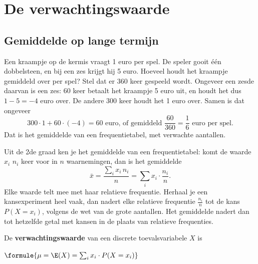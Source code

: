 \begin{oefeningen}

\end{oefeningen}

\section{De verwachtingswaarde}

\subsection{Gemiddelde op lange termijn}

Een kraampje op de kermis vraagt 1 euro per spel. De speler gooit één dobbelsteen, en bij een zes krijgt hij 5 euro. Hoeveel houdt het kraampje gemiddeld over per spel? Stel dat er 360 keer gespeeld wordt. Ongeveer een zesde daarvan is een zes: 60 keer betaalt het kraampje 5 euro uit, en houdt het dus $1 - 5 = -4$ euro over. De andere 300 keer houdt het 1 euro over. Samen is dat ongeveer
\[300 \cdot 1 + 60 \cdot (-4) = 60 \text{ euro, of gemiddeld } \frac{60}{360} = \frac16 \text{ euro per spel.}\]
Dat is het gemiddelde van een frequentietabel, met verwachte aantallen.

Uit de 2de graad ken je het gemiddelde van een frequentietabel: komt de waarde $x_i$ $n_i$ keer voor in $n$ waarnemingen, dan is het gemiddelde
\[\bar{x} = \frac{\sum_i x_i \, n_i}{n} = \sum_i x_i \cdot \frac{n_i}{n} .\]
Elke waarde telt mee met haar relatieve frequentie. Herhaal je een kansexperiment heel vaak, dan nadert elke relatieve frequentie $\frac{n_i}{n}$ tot de kans $P(X = x_i)$, volgens de wet van de grote aantallen. Het gemiddelde nadert dan tot hetzelfde getal met kansen in de plaats van relatieve frequenties.

\begin{theorie}
De \textbf{\textcolor{accent}{verwachtingswaarde}} van een discrete toevalsvariabele $X$ is

\vspace{1mm}
\qquad $\formule{\mu = \E(X) = \sum_{i} x_i \cdot P(X = x_i)}$
\end{theorie}


